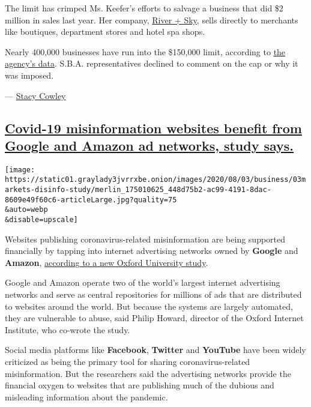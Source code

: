 The limit has crimped Ms. Keefer's efforts to salvage a business that
did \$2 million in sales last year. Her company,
\href{https://www.riverandskycalifornia.com/}{River + Sky}, sells
directly to merchants like boutiques, department stores and hotel spa
shops.

Nearly 400,000 businesses have run into the \$150,000 limit, according
to
\href{https://www.sba.gov/funding-programs/loans/coronavirus-relief-options/economic-injury-disaster-loans\#section-header-5}{the
agency's data}. S.B.A. representatives declined to comment on the cap or
why it was imposed.

--- \href{https://www.nytimes3xbfgragh.onion/by/stacy-cowley}{Stacy
Cowley}

\hypertarget{covid-19-misinformation-websites-benefit-from-google-and-amazon-ad-networks-study-says}{%
\subsection{\texorpdfstring{\protect\hyperlink{covid-19-misinformation-websites-benefit-from-google-and-amazon-ad-networks-study-says}{Covid-19
misinformation websites benefit from Google and Amazon ad networks,
study
says.}}{Covid-19 misinformation websites benefit from Google and Amazon ad networks, study says.}}\label{covid-19-misinformation-websites-benefit-from-google-and-amazon-ad-networks-study-says}}

\texttt{[image: https://static01.graylady3jvrrxbe.onion/images/2020/08/03/business/03markets-disinfo-study/merlin\_175010625\_448d75b2-ac99-4191-8dac-8609e49f60c6-articleLarge.jpg?quality=75\\\&auto=webp\\\&disable=upscale]}

Websites publishing coronavirus-related misinformation are being
supported financially by tapping into internet advertising networks
owned by \textbf{Google} and \textbf{Amazon},
\href{https://comprop.oii.ox.ac.uk/research/covid19-disinfo-seo/}{according
to a new Oxford University study}.

Google and Amazon operate two of the world's largest internet
advertising networks and serve as central repositories for millions of
ads that are distributed to websites around the world. But because the
systems are largely automated, they are vulnerable to abuse, said Philip
Howard, director of the Oxford Internet Institute, who co-wrote the
study.

Social media platforms like \textbf{Facebook}, \textbf{Twitter} and
\textbf{YouTube} have been widely criticized as being the primary tool
for sharing coronavirus-related misinformation. But the researchers said
the advertising networks provide the financial oxygen to websites that
are publishing much of the dubious and misleading information about the
pandemic.

